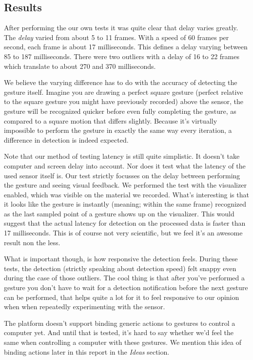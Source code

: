 \documentclass[a4paper]{article}
\begin{document}
  \subsection{Results}
  After performing the our own tests it was quite clear that delay varies
  greatly. The \emph{delay} varied from about 5 to 11 frames. With a speed of 60
  frames per second, each frame is about 17 milliseconds. This defines a delay
  varying between 85 to 187 milliseconds. There were two outliers with a delay
  of 16 to 22 frames which translate to about 270 and 370 milliseconds.

  We believe the varying difference has to do with the accuracy of detecting the
  gesture itself. Imagine you are drawing a perfect square gesture (perfect
  relative to the square gesture you might have previously recorded) above the
  sensor, the gesture will be recognized quicker before even fully completing
  the gesture, as compared to a square motion that differs slightly. Because
  it's virtually impossible to perform the gesture in exactly the same way every
  iteration, a difference in detection is indeed expected.

  Note that our method of testing latency is still quite simplistic. It doesn't
  take computer and screen delay into account. Nor does it test what the latency
  of the used sensor itself is. Our test strictly focusses on the delay between
  performing the gesture and seeing visual feedback. We performed the test with
  the visualizer enabled, which was visible on the material we recorded. What's
  interesting is that it looks like the gesture is instantly (meaning; within
  the same frame) recognized as the last sampled point of a gesture shows up on
  the visualizer. This would suggest that the actual latency for detection on
  the processed data is faster than 17 milliseconds. This is of course not very
  scientific, but we feel it's an awesome result non the less.

  What is important though, is how responsive the detection feels. During these
  tests, the detection (strictly speaking about detection speed) felt snappy
  even during the case of those outliers. The cool thing is that after you've
  performed a gesture you don't have to wait for a detection notification before
  the next gesture can be performed, that helps quite a lot for it to feel
  responsive to our opinion when when repeatedly experimenting with the sensor.

  The platform doesn't support binding
  generic actions to gestures to control a computer yet. And until that is
  tested, it's hard to say whether we'd feel the same when controlling a
  computer with these gestures. We mention this idea of binding actions later in
  this report in the \emph{Ideas} section.
\end{document}
